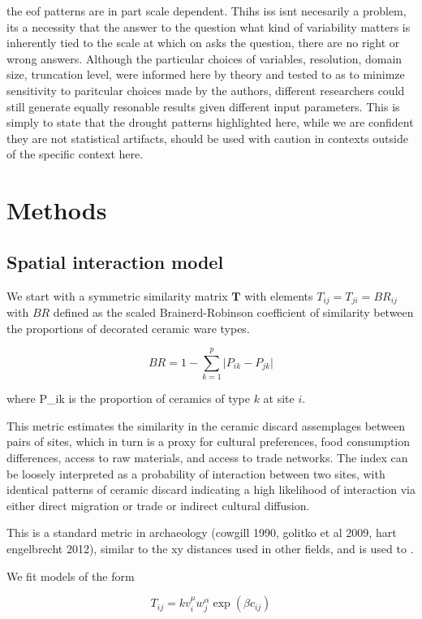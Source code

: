 \documentclass[fleqn,10pt]{wlscirep}
\begin{document}
the eof patterns are in part scale dependent. Thihs iss isnt necesarily a problem, its a necessity that the answer to the question what kind of variability matters is inherently tied to the scale at which on asks the question, there are no right or wrong answers. Although the particular choices of variables, resolution, domain size, truncation level, were informed here by theory and tested to as to minimze sensitivity to paritcular choices made by the authors, different researchers could still generate equally resonable results given  different input parameters.  This is simply to state that the drought patterns highlighted here, while we are confident they are not statistical artifacts, should be used with caution in contexts outside of the specific context here.

\section*{Methods}


\subsection*{Spatial interaction model}

We start with a symmetric similarity matrix $\mathbf{T}$ with elements $T_{ij} = T_{ji} = BR_{ij}$ with $BR$ defined as the scaled Brainerd-Robinson coefficient of similarity between the proportions of decorated ceramic ware types.

$$BR = 1 - \sum_{k=1}^{p} \lvert P_{ik} - P_{jk} \rvert$$

where P_{ik} is the proportion of ceramics of type $k$ at site $i$.

This metric estimates the similarity in the ceramic discard assemplages between pairs of sites, which in turn is a proxy for cultural preferences, food consumption differences, access to raw materials, and access to trade networks. The index can be loosely interpreted as a probability of interaction between two sites, with identical patterns of ceramic discard indicating a high likelihood of interaction via either direct migration or trade or indirect cultural diffusion.

This is a standard metric in archaeology (cowgill 1990, golitko et al 2009, hart engelbrecht 2012), similar to the xy distances used in other fields, and is used to .

We fit models of the form

$$T_{ij} = k v_i^\mu w_j^\alpha \exp(\beta c_{ij})$$
\end{document}
